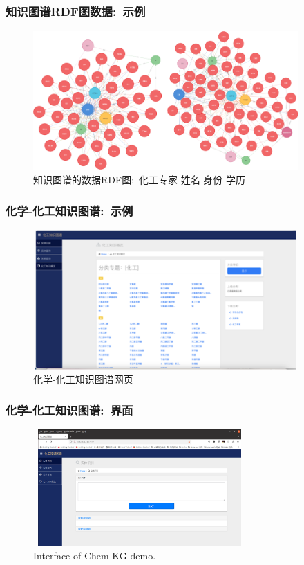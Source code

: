\begin{frame}
	\frametitle{知识图谱\textrm{RDF}图数据:~示例}
\begin{figure}[h!]
\centering
\includegraphics[height=2.10in,width=4.00in,viewport=0 0 220 115,clip]{Figures/KG_Chem-Chemist_2.png}
\caption{\tiny 知识图谱的数据\textrm{RDF}图:~化工专家-姓名-身份-学历}%
\label{Fig:KG_Chem-Chemist2}
\end{figure}
\end{frame}

\begin{frame}
	\frametitle{化学-化工知识图谱:~示例}
\begin{figure}[h!]
\centering
\includegraphics[height=2.10in,width=4.00in,viewport=0 0 240 130,clip]{Figures/KG_Chem-html.png}
\caption{\tiny 化学-化工知识图谱网页}%
\label{Fig:KG_Chem-Enflurane}
\end{figure}
\end{frame}

\begin{frame}
	\frametitle{化学-化工知识图谱:~界面}
\begin{figure}[h!]
\centering
\vskip -8pt
\includegraphics[height=1.75in,width=3.20in,viewport=0 0 1529 874,clip]{Figures/KG_Chem-Interface.png}
\caption{\tiny\textrm{Interface of Chem-KG demo.}}%
\label{Fig:KG-Entity-Interface}
\end{figure}
\end{frame}


